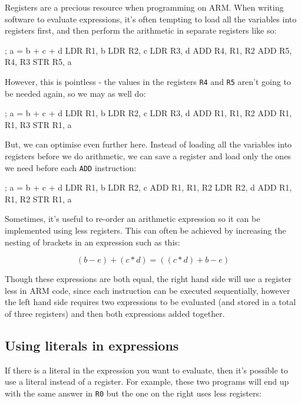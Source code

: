 Registers are a precious resource when programming on ARM. When writing software to evaluate expressions, it's often tempting to load all the variables into registers first, and then perform the arithmetic in separate registers like so:

\begin{listing}{1}
	; a = b + c + d
	LDR 	R1, b
	LDR 	R2, c
	LDR 	R3, d
	ADD 	R4, R1, R2
	ADD 	R5, R4, R3
	STR 	R5, a
\end{listing}

However, this is pointless - the values in the registers {\tt R4} and {\tt R5} aren't going to be needed again, so we may as well do:

\begin{listing}{1}
; a = b + c + d
LDR 	R1, b
LDR 	R2, c
LDR 	R3, d
ADD 	R1, R1, R2
ADD 	R1, R1, R3
STR 	R1, a
\end{listing}

But, we can optimise even further here. Instead of loading all the variables into registers before we do arithmetic, we can save a register and load only the ones we need before each {\tt ADD} instruction:

\begin{listing}{1}
; a = b + c + d
LDR 	R1, b
LDR 	R2, c
ADD 	R1, R1, R2
LDR 	R2, d
ADD 	R1, R1, R2
STR 	R1, a
\end{listing}

Sometimes, it's useful to re-order an arithmetic expression so it can be implemented using less registers. This can often be achieved by increasing the nesting of brackets in an expression such as this:

\[
	(b - e) + (c * d) = ((c * d) + b - e)
\]

Though these expressions are both equal, the right hand side will use a register less in ARM code, since each instruction can be executed sequentially, however the left hand side requires two expressions to be evaluated (and stored in a total of three registers) and then both expressions added together.

\subsection{Using literals in expressions}

If there is a literal in the expression you want to evaluate, then it's possible to use a literal instead of a register. For example, these two programs will end up with the same answer in {\tt R0} but the one on the right uses less registers:

